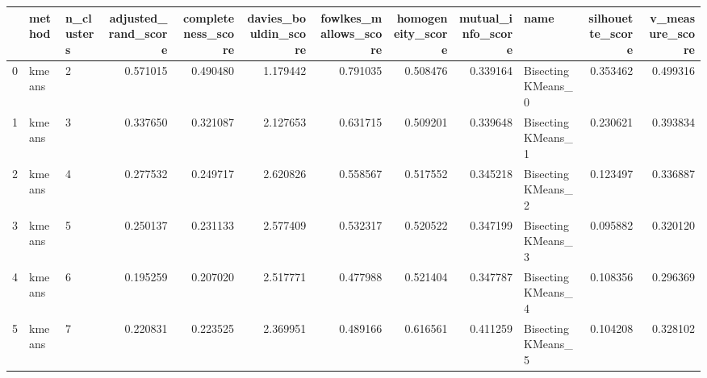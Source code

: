 \begin{tabular}{lllrrrrrrlrr}
\toprule
{} &  method & n\_clusters &  adjusted\_rand\_score &  completeness\_score &  davies\_bouldin\_score &  fowlkes\_mallows\_score &  homogeneity\_score &  mutual\_info\_score &                name &  silhouette\_score &  v\_measure\_score \\
\midrule
0 &  kmeans &          2 &             0.571015 &            0.490480 &              1.179442 &               0.791035 &           0.508476 &           0.339164 &  Bisecting KMeans\_0 &          0.353462 &         0.499316 \\
1 &  kmeans &          3 &             0.337650 &            0.321087 &              2.127653 &               0.631715 &           0.509201 &           0.339648 &  Bisecting KMeans\_1 &          0.230621 &         0.393834 \\
2 &  kmeans &          4 &             0.277532 &            0.249717 &              2.620826 &               0.558567 &           0.517552 &           0.345218 &  Bisecting KMeans\_2 &          0.123497 &         0.336887 \\
3 &  kmeans &          5 &             0.250137 &            0.231133 &              2.577409 &               0.532317 &           0.520522 &           0.347199 &  Bisecting KMeans\_3 &          0.095882 &         0.320120 \\
4 &  kmeans &          6 &             0.195259 &            0.207020 &              2.517771 &               0.477988 &           0.521404 &           0.347787 &  Bisecting KMeans\_4 &          0.108356 &         0.296369 \\
5 &  kmeans &          7 &             0.220831 &            0.223525 &              2.369951 &               0.489166 &           0.616561 &           0.411259 &  Bisecting KMeans\_5 &          0.104208 &         0.328102 \\
\bottomrule
\end{tabular}
